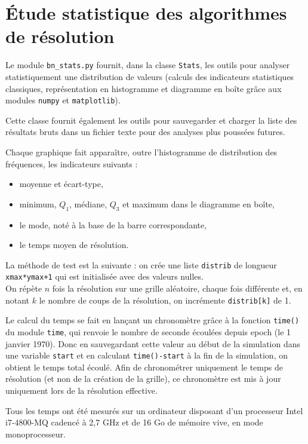 \chapter{Étude statistique des algorithmes de résolution}\label{annexe_stats}
Le module \texttt{bn\_stats.py} fournit, dans la classe \texttt{Stats}, les outils pour analyser statistiquement une distribution de valeurs (calculs des indicateurs statistiques classiques, représentation en histogramme et diagramme en boîte grâce aux modules \texttt{numpy} et \texttt{matplotlib}).

Cette classe fournit également les outils pour sauvegarder et charger la liste des résultats bruts dans un fichier texte pour des analyses plus poussées futures.

Chaque graphique fait apparaître, outre l'histogramme de distribution des fréquences, les indicateurs suivants :
\begin{itemize}
\item moyenne et écart-type,
\item minimum, $Q_1$, médiane, $Q_3$ et maximum dans le diagramme en boîte,
\item le mode, noté à la base de la barre correspondante,
\item le temps moyen de résolution.
\end{itemize}

\medskip

La méthode de test est la suivante : on crée une liste \texttt{distrib} de longueur \texttt{xmax*ymax+1} qui est initialisée avec des valeurs nulles.\\
On répète $n$ fois la résolution sur une grille aléatoire, chaque fois différente et, en notant $k$ le nombre de coups de la résolution, on incrémente \texttt{distrib[k]} de 1.

\medskip

Le calcul du temps se fait en lançant un chronomètre grâce à la fonction \texttt{time()} du module \texttt{time}, qui renvoie le nombre de seconde écoulées depuis epoch (le 1 janvier 1970). Donc en sauvegardant cette valeur au début de la simulation dans une variable \texttt{start} et en calculant \texttt{time()-start} à la fin de la simulation, on obtient le temps total écoulé. Afin de chronométrer uniquement le temps de résolution (et non de la création de la grille), ce chronomètre est mis à jour uniquement lors de la résolution effective.

Tous les temps ont été mesurés sur un ordinateur disposant d'un processeur Intel i7-4800-MQ cadencé à 2,7 GHz et de 16 Go de mémoire vive, en mode monoprocesseur.

